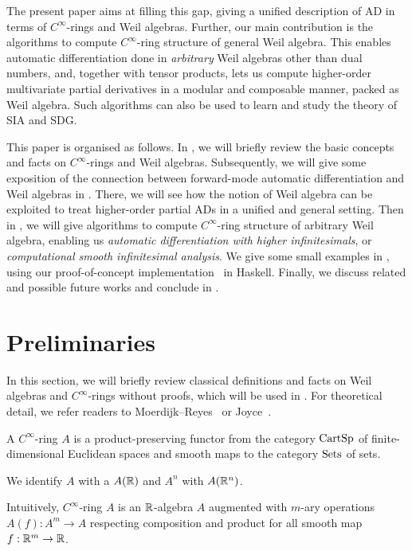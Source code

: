 \documentclass[%
  sigconf,authorversion,screen]{acmart}
\begin{document}
The present paper aims at filling this gap, giving a unified description of AD in terms of $C^\infty$-rings and Weil algebras.
Further, our main contribution is the algorithms to compute $C^\infty$-ring structure of general Weil algebra.
This enables automatic differentiation done in \emph{arbitrary} Weil algebras other than dual numbers, and, together with tensor products, lets us compute higher-order multivariate partial derivatives in a modular and composable manner, packed as Weil algebra.
Such algorithms can also be used to learn and study the theory of SIA and SDG.

This paper is organised as follows.
In , we will briefly review the basic concepts and facts on $C^\infty$-rings and Weil algebras.
Subsequently, we will give some exposition of the connection between forward-mode automatic differentiation and Weil algebras in .
There, we will see how the notion of Weil algebra can be exploited to treat higher-order partial ADs in a unified and general setting.
Then in , we will give algorithms to compute $C^\infty$-ring structure of arbitrary Weil algebra, enabling us \emph{automatic differentiation with higher infinitesimals}, or \emph{computational smooth infinitesimal analysis}.
We give some small examples in , using our proof-of-concept implementation~\cite{Ishii:2020aa} in Haskell.
Finally, we discuss related and possible future works and conclude in .

\section{Preliminaries}\label{sec:prel}
In this section, we will briefly review classical definitions and facts on Weil algebras and $C^\infty$-rings without proofs, which will be used in .
For theoretical detail, we refer readers to Moerdijk--Reyes~\cite[Chapters I and II]{Moerdijk:1991aa} or Joyce~\cite{joyce2016algebraic}.

\begin{definition}
  A \emph{$C^\infty$}-ring $A$ is a product-preserving functor from the category $\mathord{\mathrm{CartSp}}$ of finite-dimensional Euclidean spaces and smooth maps to the category $\mathord{\mathrm{Sets}}$ of sets.

  We identify $A$ with a $A(\mathbb{R})$ and $A^n$ with $A(\mathbb{R}^n)$.
\end{definition}

Intuitively, $C^\infty$-ring $A$ is an $\mathbb{R}$-algebra $A$ augmented with $m$-ary operations $A(f): A^m \to A$ respecting composition and product for all smooth map $f: \mathbb{R}^m \to \mathbb{R}$.
\end{document}
